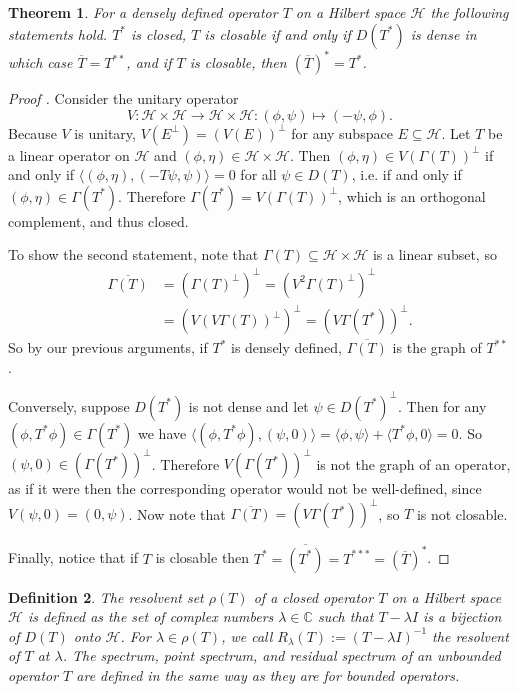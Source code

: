 \documentclass[12pt,oneside]{report}
\newtheorem{thm}{Theorem}[chapter]
\newtheorem{defn}[thm]{Definition}
\begin{document}
\begin{thm}
    For a densely defined operator $T$ on a Hilbert space $\mathscr{H}$ the following statements hold. $T^{*}$ is closed, $T$ is closable if and only if $D(T^{*})$ is dense in which case $\overline{T} = T^{**}$, and if $T$ is closable, then $(\overline{T})^{*} = T^{*}$.
\end{thm}
\begin{proof}[Proof \cite{Reed_Simon_1980}]%
    Consider the unitary operator $$V: \mathscr{H} \times \mathscr{H} \to \mathscr{H} \times \mathscr{H}: (\phi,\psi) \mapsto (-\psi,\phi).$$Because $V$ is unitary, $V(E^{\perp}) = (V(E))^{\perp}$ for any subspace $E \subseteq \mathscr{H}$. Let $T$ be a linear operator on $\mathscr{H}$ and $(\phi, \eta) \in \mathscr{H} \times \mathscr{H}$. Then $(\phi, \eta) \in V(\Gamma(T))^{\perp}$ if and only if $\langle (\phi,\eta), (-T\psi,\psi) \rangle = 0$ for all $\psi \in D(T)$, i.e. if and only if $(\phi, \eta) \in \Gamma(T^{*})$. Therefore $\Gamma(T^{*}) = V(\Gamma(T))^{\perp}$, which is an orthogonal complement, and thus closed.

    To show the second statement, note that $\Gamma(T) \subseteq \mathscr{H} \times \mathscr{H}$ is a linear subset, so
    \begin{align*}
        \overline{\Gamma(T)} &= (\Gamma(T)^{\perp})^{\perp} = (V^{2}\Gamma(T)^{\perp})^{\perp} \\
        &= (V(V\Gamma(T))^{\perp})^{\perp} = (V\Gamma(T^{*}))^{\perp}.
    \end{align*}
    So by our previous arguments, if $T^{*}$ is densely defined, $\overline{\Gamma(T)}$ is the graph of $T^{**}$.

    Conversely, suppose $D(T^{*})$ is not dense and let $\psi \in D(T^{*})^{\perp}$. 
    Then for any $(\phi, T^{*}\phi) \in \Gamma(T^{*})$ we have $\langle (\phi, T^{*}\phi), (\psi,0) \rangle = \langle \phi, \psi \rangle + \langle T^{*}\phi, 0 \rangle = 0$. So $(\psi, 0) \in (\Gamma(T^{*}))^{\perp}$.
    Therefore $V(\Gamma(T^{*}))^{\perp}$ is not the graph of an operator, as if it were then the corresponding operator would not be well-defined, since $V(\psi, 0) = (0, \psi)$. Now note that $\overline{\Gamma(T)} = (V\Gamma(T^{*}))^{\perp}$, so $T$ is not closable.

    Finally, notice that if $T$ is closable then $T^{*} = \overline{(T^{*})} = T^{***} = (\overline{T})^{*}$.
\end{proof}

\begin{defn}
    The resolvent set $\rho(T)$ of a closed operator $T$ on a Hilbert space $\mathscr{H}$ is defined as the set of complex numbers $\lambda \in \mathbb{C}$ such that $T - \lambda I$ is a bijection of $D(T)$ onto $\mathscr{H}$. For $\lambda \in \rho(T)$, we call $R_\lambda (T) := (T - \lambda I)^{-1}$ the resolvent of $T$ at $\lambda$. The spectrum, point spectrum, and residual spectrum of an unbounded operator $T$ are defined in the same way as they are for bounded operators.
\end{defn}
\end{document}
